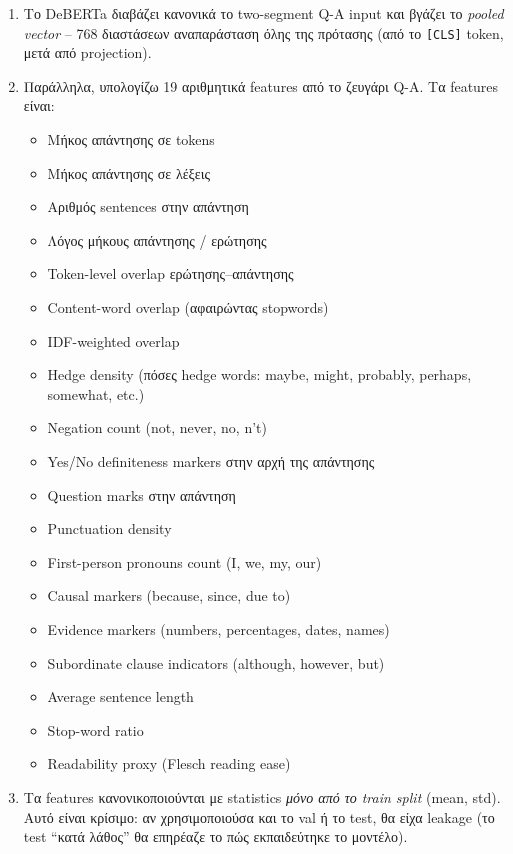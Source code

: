 \documentclass[12pt]{fphw}
\begin{document}
\begin{enumerate}
    \item Το DeBERTa διαβάζει κανονικά το two-segment Q-A input και βγάζει το \emph{pooled vector} -- 768 διαστάσεων αναπαράσταση όλης της πρότασης (από το \texttt{[CLS]} token, μετά από projection).

    \item Παράλληλα, υπολογίζω 19 αριθμητικά features από το ζευγάρι Q-A. Τα features είναι:
    \begin{itemize}
        \item Μήκος απάντησης σε tokens
        \item Μήκος απάντησης σε λέξεις
        \item Αριθμός sentences στην απάντηση
        \item Λόγος μήκους απάντησης / ερώτησης
        \item Token-level overlap ερώτησης--απάντησης
        \item Content-word overlap (αφαιρώντας stopwords)
        \item IDF-weighted overlap
        \item Hedge density (πόσες hedge words: maybe, might, probably, perhaps, somewhat, etc.)
        \item Negation count (not, never, no, n't)
        \item Yes/No definiteness markers στην αρχή της απάντησης
        \item Question marks στην απάντηση
        \item Punctuation density
        \item First-person pronouns count (I, we, my, our)
        \item Causal markers (because, since, due to)
        \item Evidence markers (numbers, percentages, dates, names)
        \item Subordinate clause indicators (although, however, but)
        \item Average sentence length
        \item Stop-word ratio
        \item Readability proxy (Flesch reading ease)
    \end{itemize}

    \item Τα features κανονικοποιούνται με statistics \emph{μόνο από το train split} (mean, std). Αυτό είναι κρίσιμο: αν χρησιμοποιούσα και το val ή το test, θα είχα leakage (το test ``κατά λάθος'' θα επηρέαζε το πώς εκπαιδεύτηκε το μοντέλο).


\end{enumerate}
\end{document}

